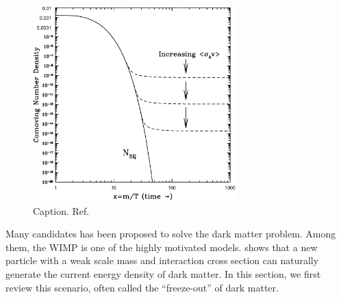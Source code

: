 \documentclass[doublespace,nopageskip]{VTthesis} %
\begin{document}
\begin{figure}[htb]
    \centering
    \includegraphics[width=0.7\textwidth]{Figures/Intro/freezeout.ps}
    \caption{Caption. Ref.~\cite{2009arXiv0901.4090H}}
    \label{fig:my_label}
\end{figure}

Many candidates has been proposed to solve the dark matter problem. Among them, the WIMP is one of the highly motivated models. \citet{1979ARNPS..29..313S} shows that a new particle with a weak scale mass and interaction cross section can naturally generate the current energy density of dark matter. In this section, we first review this scenario, often called the ``freeze-out'' of dark matter.

\end{document}
